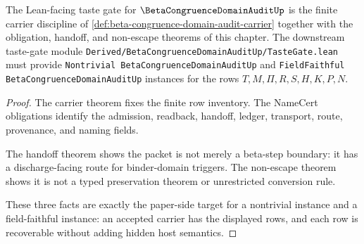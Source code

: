 \begin{theorem}
\label{thm:beta-congruence-domain-audit-tastegate-target}
The Lean-facing taste gate for $\BetaCongruenceDomainAuditUp$ is the finite carrier discipline of \autoref{def:beta-congruence-domain-audit-carrier} together with the obligation, handoff, and non-escape theorems of this chapter. The downstream taste-gate module \texttt{Derived/BetaCongruenceDomainAuditUp/TasteGate.lean} must provide \texttt{Nontrivial BetaCongruenceDomainAuditUp} and \texttt{FieldFaithful BetaCongruenceDomainAuditUp} instances for the rows $T,M,\Pi,R,S,H,K,P,N$.
\end{theorem}
\begin{proof}
The carrier theorem fixes the finite row inventory. The NameCert obligations identify the admission, readback, handoff, ledger, transport, route, provenance, and naming fields.

The handoff theorem shows the packet is not merely a beta-step boundary: it has a discharge-facing route for binder-domain triggers. The non-escape theorem shows it is not a typed preservation theorem or unrestricted conversion rule.

These three facts are exactly the paper-side target for a nontrivial instance and a field-faithful instance: an accepted carrier has the displayed rows, and each row is recoverable without adding hidden host semantics.
\end{proof}

\begin{closurestatus}{\BetaCongruenceDomainAuditUp}
  \theoryclosure{\seedClosure}
  \formalstatus{\unformalizedV}
\end{closurestatus}
